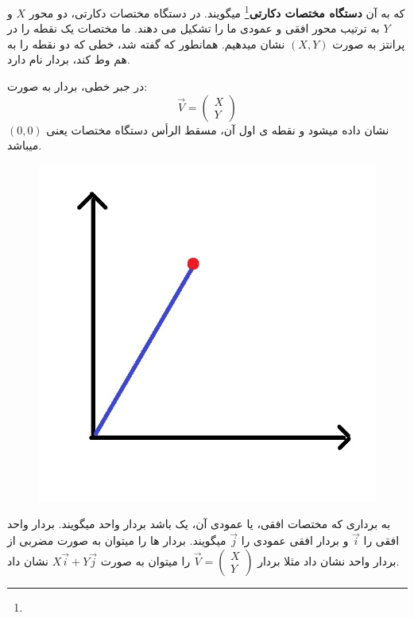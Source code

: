 \documentclass[14pt,a4paper]{memoir}
\begin{document}
	 که به آن \textbf{دستگاه مختصات دکارتی}\footnote{} میگویند. در دستگاه مختصات دکارتی، دو محور $ X $ و $ Y $ به ترتیب محور افقی و عمودی ما را تشکیل می دهند. ما مختصات یک نقطه را در پرانتز به صورت $ (X, Y) $ نشان میدهیم. همانطور که گفته شد، خطی که دو نقطه را به هم وط کند، بردار نام دارد.
	 
	 در جبر خطی، بردار  به صورت:	 
	 \[\vec{V} = \begin{pmatrix}
	 X \\ Y
	 \end{pmatrix}
	 \] 	 
	 نشان داده میشود و نقطه ی اول آن، مسقط الرأس دستگاه مختصات یعنی $ (0, 0) $ میباشد. 	 
\begin{figure}[H]
	\centering
		\includegraphics[scale=0.8]{LinAlgVec}
	
\end{figure}
		به برداری که مختصات افقی، یا عمودی آن، یک باشد بردار واحد میگویند. بردار واحد افقی را $ \vec{i} $ و بردار افقی عمودی را $ \vec{j} $ میگویند. بردار ها را میتوان به صورت مضربی از بردار واحد نشان داد مثلا بردار $ \vec{V} = \begin{pmatrix}
	X \\ Y
	\end{pmatrix}$ را میتوان به صورت $ X\vec{i} + Y\vec{j} $ نشان داد. 
	
	
	
\end{document}
